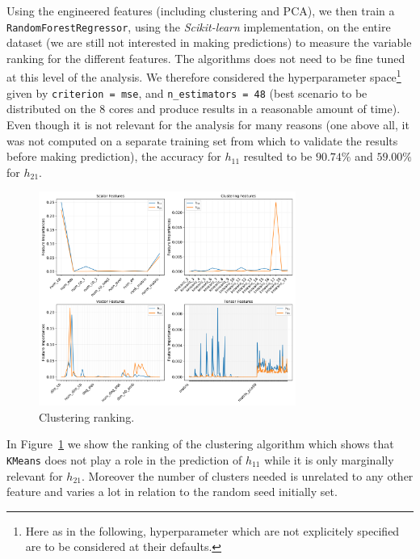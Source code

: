     Using the engineered features (including clustering and PCA), we then train a \texttt{RandomForestRegressor}, using the \textit{Scikit-learn} implementation, on the entire dataset (we are still not interested in making predictions) to measure the variable ranking for the different features. The algorithms does not need to be fine tuned at this level of the analysis. We therefore considered the hyperparameter space\footnote{Here as in the following, hyperparameter which are not explicitely specified are to be considered at their defaults.} given by \texttt{criterion = mse}, and \texttt{n\_estimators = 48} (best scenario to be distributed on the 8 cores and produce results in a reasonable amount of time). Even though it is not relevant for the analysis for many reasons (one above all, it was not computed on a separate training set from which to validate the results before making prediction), the accuracy for $h_{11}$ resulted to be $90.74\%$ and $59.00\%$ for $h_{21}$.
    
    \begin{figure}[!t]
        \centering
        \includegraphics[width=0.75\textwidth,
                         trim={6in 5in 0 0},
                         clip
                        ]{tex/img/feature_importances.png}
        \caption{Clustering ranking.}
        \label{fig:clustering_importances}
    \end{figure}
    
    In Figure~\ref{fig:clustering_importances} we show the ranking of the clustering algorithm which shows that \texttt{KMeans} does not play a role in the prediction of $h_{11}$ while it is only marginally relevant for $h_{21}$. Moreover the number of clusters needed is unrelated to any other feature and varies a lot in relation to the random seed initially set.
    
